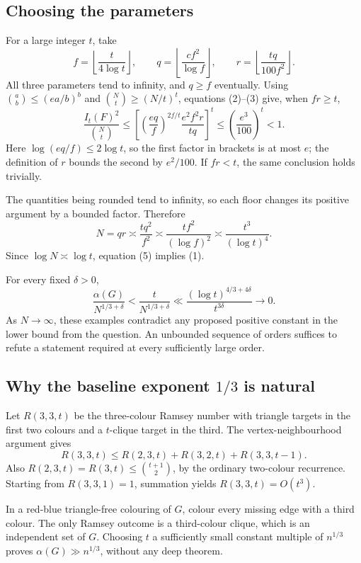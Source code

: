 \subsection*{Choosing the parameters}
For a large integer \(t\), take
\[
f=\left\lfloor\frac{t}{4\log t}\right\rfloor,\qquad
q=\left\lfloor\frac{cf^2}{\log f}\right\rfloor,\qquad
r=\left\lfloor\frac{tq}{100f^2}\right\rfloor.
\]
All three parameters tend to infinity, and \(q\geq f\) eventually. Using
\(\binom ab\leq(ea/b)^b\) and \(\binom Nt\geq(N/t)^t\), equations (2)--(3) give, when \(fr\geq t\),
\[
\frac{I_t(F)^2}{\binom Nt}
\leq
\left[
\left(\frac{eq}{f}\right)^{2f/t}
\frac{e^2f^2r}{tq}
\right]^t
\leq\left(\frac{e^3}{100}\right)^t<1. \tag{4}
\]
Here \(\log(eq/f)\leq2\log t\), so the first factor in brackets is at most \(e\); the definition of \(r\) bounds the second by \(e^2/100\). If \(fr<t\), the same conclusion holds trivially.

The quantities being rounded tend to infinity, so each floor changes its positive argument by a bounded factor. Therefore
\[
N=qr\asymp \frac{tq^2}{f^2}
\asymp \frac{tf^2}{(\log f)^2}
\asymp \frac{t^3}{(\log t)^4}. \tag{5}
\]
Since \(\log N\asymp\log t\), equation (5) implies (1).

For every fixed \(\delta>0\),
\[
\frac{\alpha(G)}{N^{1/3+\delta}}
<\frac{t}{N^{1/3+\delta}}
\ll \frac{(\log t)^{4/3+4\delta}}{t^{3\delta}}
\longrightarrow0.
\]
As \(N\to\infty\), these examples contradict any proposed positive constant in the lower bound from the question. An unbounded sequence of orders suffices to refute a statement required at every sufficiently large order.

\subsection*{Why the baseline exponent \(1/3\) is natural}
Let \(R(3,3,t)\) be the three-colour Ramsey number with triangle targets in the first two colours and a \(t\)-clique target in the third. The vertex-neighbourhood argument gives
\[
R(3,3,t)\leq R(2,3,t)+R(3,2,t)+R(3,3,t-1).
\]
Also \(R(2,3,t)=R(3,t)\leq\binom{t+1}{2}\), by the ordinary two-colour recurrence. Starting from \(R(3,3,1)=1\), summation yields \(R(3,3,t)=O(t^3)\).

In a red-blue triangle-free colouring of \(G\), colour every missing edge with a third colour. The only Ramsey outcome is a third-colour clique, which is an independent set of \(G\). Choosing \(t\) a sufficiently small constant multiple of \(n^{1/3}\) proves \(\alpha(G)\gg n^{1/3}\), without any deep theorem.

